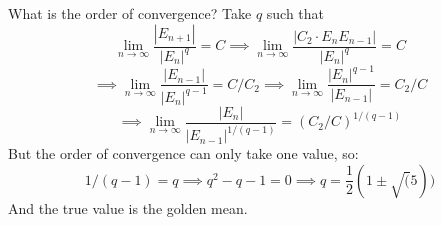 \documentclass[12pt]{amsart}
\theoremstyle{definition}
\begin{document}
What is the order of convergence? Take $q$ such that
\[
\lim_{n \to \infty} \dfrac{|E_{n+1}|}{|E_n|^q} = C \implies \lim_{n \to \infty} \dfrac{|C_2 \cdot E_nE_{n-1}|}{|E_n|^q} = C \]
\[
\implies \lim_{n \to \infty} \dfrac{|E_{n-1}|}{|E_n|^{q-1}} = C/C_2 \implies \lim_{n \to \infty} \dfrac{|E_{n}|^{q-1}}{|E_{n-1}|} =C_2/ C
\]
\[\implies \lim_{n \to \infty} \dfrac{|E_{n}|}{|E_{n-1}|^{1/(q-1)}} = (C_2/C)^{1/(q-1)}
\]
But the order of convergence can only take one value, so:
\[
1/(q-1) = q \implies q^2 - q - 1 = 0 \implies q = \frac{1}{2}(1 \pm \sqrt(5))
\]
And the true value is the golden mean.
\end{document}
